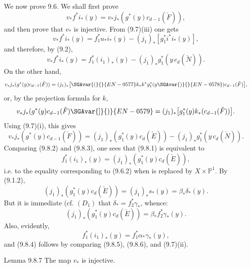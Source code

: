 We now prove 9.6. We shall first prove
\[
v_*f^*i_*(y)=v_*j_*(g^*(y)c_{d-1}(\check F)),
\tag{9.8.1}
\]
and then prove that $v_*$ is injective. From (9.7)(iii) one gets
\[
v_*f^*i_*(y)=f_1^*u_*i_*(y)-(j_1)_*[g_1^*i^*i_*(y)],
\]
and therefore, by (9.2),
\[
v_*f^*i_*(y)=f_1^*(i_1)_*(y)-(j_1)_*g_1^*(y\,c_d(\check N)).
\tag{9.8.2}
\]
On the other hand,
\[
v_*j_*(g^*(y)c_{d-1}(\check F))
=(j_1)_*\bigl[\SGAvar{(}{}{EN-0577}k_*k^*g_1^*(y\SGAvar{)}{}{EN-0578})c_{d-1}(\check F)\bigr],
\]
or, by the projection formula for $k$,
\[
v_*j_*(g^*(y)c_{d-1}(\check F)\SGAvar{]}{)}{EN-0579}
=(j_1)_*\bigl[g_1^*(y)k_*(c_{d-1}(\check F))\bigr].
\]
Using (9.7)(i), this gives
\[
v_*j_*(g^*(y)c_{d-1}(\check F))
=(j_1)_*(g_1^*(y)c_d(\check E))-(j_1)_*g_1^*(y\,c_d(\check N)).
\tag{9.8.3}
\]
Comparing (9.8.2) and (9.8.3), one sees that (9.8.1) is equivalent to
\[
f_1^*(i_1)_*(y)=(j_1)_*(g_1^*(y)c_d(\check E)),
\tag{9.8.4}
\]
i.e. to the equality corresponding to (9.6.2) when is replaced by $X\times\mathbb P^1$. By (9.1.2),
\[
(j_1)_*(g_1^*(y)c_d(\check E))=(j_1)_*s_*(y)=\beta_*\delta_*(y).
\]
But it is immediate (cf. $(D_1)$ that $\delta_*=f_2^*\gamma_*$, whence:
\[
(j_1)_*(g_1^*(y)c_d(\check E))=\beta_*f_2^*\gamma_*(y).
\tag{9.8.5}
\]
Also, evidently,
\[
f_1^*(i_1)_*(y)=f_1^*\alpha_*\gamma_*(y),
\tag{9.8.6}
\]
and (9.8.4) follows by comparing (9.8.5), (9.8.6), and (9.7)(ii).

\begin{statement}{Lemma 9.8.7}
The map $v_*$ is injective.
\end{statement}

